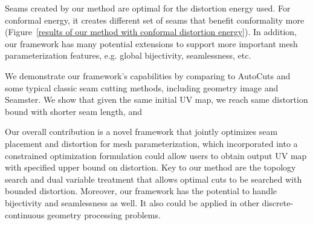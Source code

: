 Seams created by our method are optimal for the distortion energy used. For conformal energy, it creates different set of seams that benefit conformality more (Figure~\ref{results of our method with conformal distortion energy}). In addition, our framework has many potential extensions to support more important mesh parameterization features, e.g. global bijectivity, seamlessness, etc.

We demonstrate our framework's capabilities by comparing to AutoCuts and some typical classic seam cutting methods, including geometry image and Seamster. We show that given the same initial UV map, we reach same distortion bound with shorter seam length, and 

Our overall contribution is a novel framework that jointly optimizes seam placement and distortion for mesh parameterization, which incorporated into a constrained optimization formulation could allow users to obtain output UV map with specified upper bound on distortion. Key to our method are the topology search and dual variable treatment that allows optimal cuts to be searched with bounded distortion. Moreover, our framework has the potential to handle bijectivity and seamlessness as well. It also could be applied in other discrete-continuous geometry processing problems.
